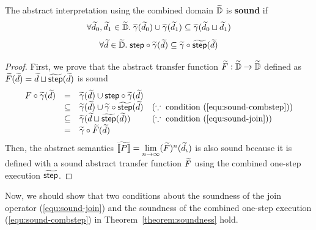\begin{theorem}[Soundness]\label{theorem:soundness}
  The abstract interpretation using the combined domain $\widetilde{\mathbb{D}}$ is
  \textbf{sound} if
  \begin{equation}\label{equ:sound-join}
    \forall \widetilde{d}_0, \widetilde{d}_1 \in \widetilde{\mathbb{D}}. \; \widetilde{\gamma}(\widetilde{d}_0) \cup
    \widetilde{\gamma}(\widetilde{d}_1) \subseteq \widetilde{\gamma}(\widetilde{d}_0 \sqcup \widetilde{d}_1)
  \end{equation}
  \begin{equation}\label{equ:sound-combstep}
    \forall \widetilde{d} \in \widetilde{\mathbb{D}}. \; \textsf{step} \circ \widetilde{\gamma}(\widetilde{d}) \subseteq
    \widetilde{\gamma} \circ \widetilde{\textsf{step}}(\widetilde{d})\\
  \end{equation}
\end{theorem}
\begin{proof}
  First, we prove that the abstract transfer function $\widetilde{F}: \widetilde{\mathbb{D}}
  \rightarrow \widetilde{\mathbb{D}}$ defined as $\widetilde{F}(\widetilde{d}) = \widetilde{d} \sqcup
  \widetilde{\textsf{step}}(\widetilde{d})$ is sound
  \[
    \begin{array}{rcll}
      F \circ \widetilde{\gamma}(\widetilde{d})
      &=& \widetilde{\gamma}(\widetilde{d}) \cup \textsf{step} \circ \widetilde{\gamma}(\widetilde{d})\\
      &\subseteq& \widetilde{\gamma}(\widetilde{d}) \cup \widetilde{\gamma} \circ \widetilde{\textsf{step}}(\widetilde{d})
      & (\because \; \text{condition~(\ref{equ:sound-combstep})})\\
      &\subseteq& \widetilde{\gamma}(\widetilde{d} \sqcup \widetilde{\textsf{step}}(\widetilde{d}))
      & (\because \; \text{condition~(\ref{equ:sound-join})})\\
      &=& \widetilde{\gamma} \circ \widetilde{F}(\widetilde{d})\\
    \end{array}
  \]
  Then, the abstract semantics $\widetilde{\llbracket P \rrbracket} = \underset{n \rightarrow
  \infty}{\lim}{(\widetilde{F})^n(\widetilde{d}_\iota)} $ is also sound because it is
  defined with a sound abstract transfer function $\widetilde{F}$ using the
  combined one-step execution $\widetilde{\textsf{step}}$.
\end{proof}

Now, we should show that two conditions about the soundness of the join
operator (\ref{equ:sound-join}) and the soundness of the combined one-step
execution (\ref{equ:sound-combstep}) in Theorem~\ref{theorem:soundness} hold.

